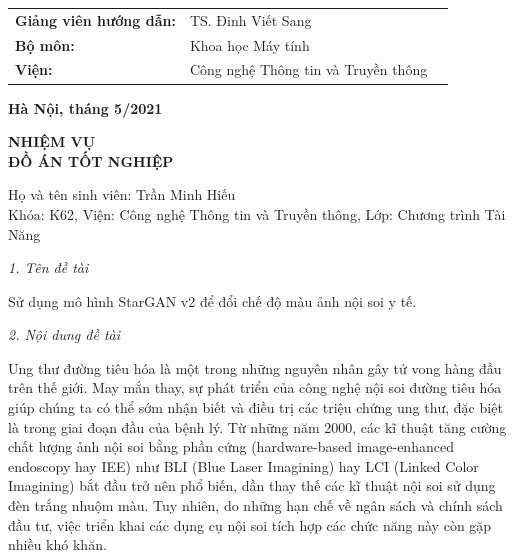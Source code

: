 \documentclass[12pt]{extreport}
\begin{document}
\vspace{1.5cm}
\begin{center}
    \begin{tabular}{l l c}
        \textbf{Giảng viên hướng dẫn:} & TS. Đinh Viết Sang                  & \hrulefill                                \\
        \textbf{Bộ môn:}               & Khoa học Máy tính                   & \fontsize{8pt}{1}\selectfont{Chữ kí GVHD} \\
        \textbf{Viện:}                 & Công nghệ Thông tin và Truyền thông &                                           \\
    \end{tabular}
\end{center}

\vspace{1.0cm}
\begin{center}
    \textbf{{Hà Nội, tháng 5/2021}}\\
\end{center}

\newpage

\begin{center}
    \fontsize{8pt}{1}
\end{center}

\vspace{1.0cm}
\begin{center}
    \large\textbf{NHIỆM VỤ \\
        ĐỒ ÁN TỐT NGHIỆP}
\end{center}

\vspace{0.5cm}
\justify
Họ và tên sinh viên: Trần Minh Hiếu \\
Khóa: K62, Viện: Công nghệ Thông tin và Truyền thông, Lớp: Chương trình Tài Năng

\textit{1. Tên đề tài}

Sử dụng mô hình StarGAN v2 để đổi chế độ màu ảnh nội soi y tế.

\textit{2. Nội dung đề tài}

Ung thư đường tiêu hóa là một trong những nguyên nhân gây tử vong hàng đầu trên thế giới. May mắn thay, sự phát triển của công nghệ nội soi đường tiêu hóa giúp chúng ta có thể sớm nhận biết và điều trị các triệu chứng ung thư, đặc biệt là trong giai đoạn đầu của bệnh lý. Từ những năm 2000, các kĩ thuật tăng cường chất lượng ảnh nội soi bằng phần cứng (hardware-based image-enhanced endoscopy hay IEE) như BLI (Blue Laser Imagining) hay LCI (Linked Color Imagining) bắt đầu trở nên phổ biến, dần thay thế các kĩ thuật nội soi sử dụng đèn trắng nhuộm màu. Tuy nhiên, do những hạn chế về ngân sách và chính sách đầu tư, việc triển khai các dụng cụ nội soi tích hợp các chức năng này còn gặp nhiều khó khăn.
\end{document}
